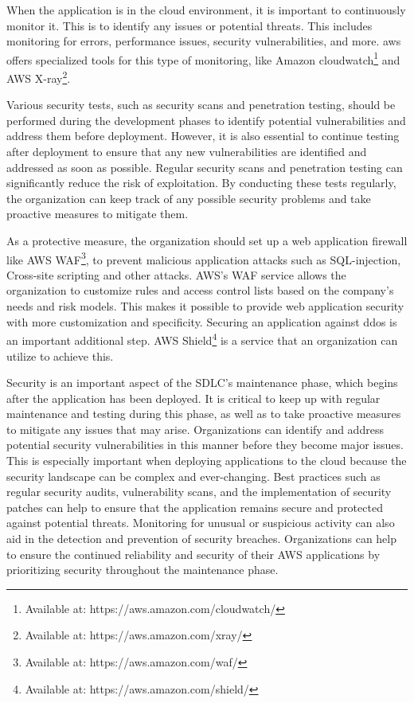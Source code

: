 When the application is in the cloud environment, it is important to continuously monitor it. This is to identify any issues or potential threats. This includes monitoring for errors, performance issues, security vulnerabilities, and more. \acrshort{aws} offers specialized tools for this type of monitoring, like Amazon cloudwatch\footnote{Available at: https://aws.amazon.com/cloudwatch/} and AWS X-ray\footnote{Available at: https://aws.amazon.com/xray/}. 

Various security tests, such as security scans and penetration testing, should be performed during the development phases to identify potential vulnerabilities and address them before deployment. However, it is also essential to continue testing after deployment to ensure that any new vulnerabilities are identified and addressed as soon as possible. Regular security scans and penetration testing can significantly reduce the risk of exploitation. By conducting these tests regularly, the organization can keep track of any possible security problems and take proactive measures to mitigate them.

As a protective measure, the organization should set up a web application firewall like AWS WAF\footnote{Available at: https://aws.amazon.com/waf/}, to prevent malicious application attacks such as \gls{SQL-injection}, \gls{Cross-site scripting} and other attacks. AWS's WAF service allows the organization to customize rules and access control lists based on the company's needs and risk models. This makes it possible to provide web application security with more customization and specificity. Securing an application against \gls{ddos} is an important additional step. AWS Shield\footnote{Available at: https://aws.amazon.com/shield/} is a service that an organization can utilize to achieve this. \cite{awsafterdep}

Security is an important aspect of the SDLC's maintenance phase, which begins after the application has been deployed. It is critical to keep up with regular maintenance and testing during this phase, as well as to take proactive measures to mitigate any issues that may arise. Organizations can identify and address potential security vulnerabilities in this manner before they become major issues. This is especially important when deploying applications to the cloud because the security landscape can be complex and ever-changing. Best practices such as regular security audits, vulnerability scans, and the implementation of security patches can help to ensure that the application remains secure and protected against potential threats. Monitoring for unusual or suspicious activity can also aid in the detection and prevention of security breaches. Organizations can help to ensure the continued reliability and security of their AWS applications by prioritizing security throughout the maintenance phase.
\newpage
